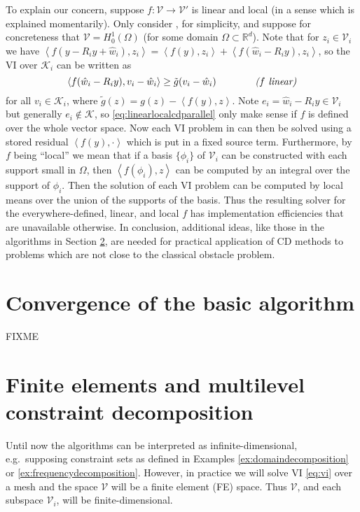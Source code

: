 \documentclass[letterpaper,final,12pt,reqno]{amsart}
\theoremstyle{cstyle}
\theoremstyle{dstyle}
\numberwithin{equation}{section}
\numberwithin{figure}{section}
\numberwithin{table}{section}
\numberwithin{theorem}{section}
\newcommand{\RR}{\mathbb{R}}
\newcommand{\cK}{\mathcal{K}}
\newcommand{\cV}{\mathcal{V}}
\newcommand{\ip}[2]{\left<#1,#2\right>}
\begin{document}
To explain our concern, suppose $f:\cV \to \cV'$ is linear and local (in a sense which is explained momentarily).  Only consider , for simplicity, and suppose for concreteness that $\cV = H_0^1(\Omega)$ (for some domain $\Omega \subset \RR^d$).  Note that for $z_i \in \cV_i$ we have $\ip{f(y - R_i y + \hat w_i)}{z_i} = \ip{f(y)}{z_i} + \ip{f(\hat w_i - R_i y)}{z_i}$, so the VI over $\cK_i$ can be written as
\begin{equation}
\ip{f(\hat w_i - R_i y)}{v_i-\hat w_i} \ge \tilde g(v_i-\hat w_i)  \qquad\qquad \text{\emph{($f$ linear)}} \label{eq:linearlocalcdparallel}
\end{equation}
for all $v_i\in \cK_i$, where $\tilde g(z) = g(z) - \ip{f(y)}{z}$.  Note $e_i = \hat w_i - R_i y \in \cV_i$ but generally $e_i \notin \cK$, so \eqref{eq:linearlocalcdparallel} only make sense if $f$ is defined over the whole vector space.  Now each VI problem in  can then be solved using a stored residual $\ip{f(y)}{\cdot}$ which is put in a fixed source term.  Furthermore, by $f$ being ``local'' we mean that if a basis $\{\phi_i\}$ of $\cV_i$ can be constructed with each support small in $\Omega$, then $\ip{f(\phi_i)}{z}$ can be computed by an integral over the support of $\phi_i$.  Then the solution of each VI problem \label{eq:linearlocalcdparallel} can be computed by local means over the union of the supports of the basis.  Thus the resulting solver for the everywhere-defined, linear, and local $f$ has implementation efficiencies that are unavailable otherwise.  In conclusion, additional ideas, like those in the algorithms in Section \ref{sec:multilevel}, are needed for practical application of CD methods to problems which are not close to the classical obstacle problem.


\section{Convergence of the basic algorithm} \label{sec:convergence}

FIXME


\section{Finite elements and multilevel constraint decomposition} \label{sec:multilevel}

Until now the algorithms can be interpreted as infinite-dimensional, e.g.~supposing constraint sets as defined in Examples \ref{ex:domaindecomposition} or \ref{ex:frequencydecomposition}.  However, in practice we will solve VI \eqref{eq:vi} over a mesh and the space $\cV$ will be a finite element (FE) space.  Thus $\cV$, and each subspace $\cV_i$, will be finite-dimensional.
\end{document}
